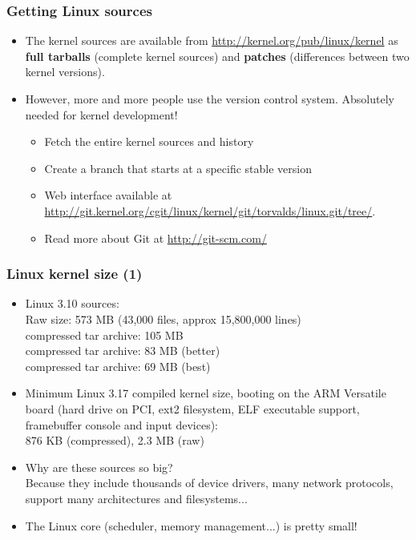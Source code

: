\begin{frame}
  \frametitle{Getting Linux sources}
  \begin{itemize}

  \item The kernel sources are available from
    \url{http://kernel.org/pub/linux/kernel} as {\bf full tarballs}
    (complete kernel sources) and {\bf patches} (differences between
    two kernel versions).
  \item However, more and more people use the  version
    control system. Absolutely needed for kernel development!
    \begin{itemize}
    \item Fetch the entire kernel sources and history\\
    \item Create a branch that starts at a specific stable version\\
    \item Web interface available at
      \url{http://git.kernel.org/cgit/linux/kernel/git/torvalds/linux.git/tree/}.
    \item Read more about Git at \url{http://git-scm.com/}
    \end{itemize}
  \end{itemize}
\end{frame}

\begin{frame}
  \frametitle{Linux kernel size (1)}
  \begin{itemize}
  \item Linux 3.10 sources:\\
    Raw size: 573 MB (43,000 files, approx 15,800,000 lines)\\
     compressed tar archive: 105 MB\\
     compressed tar archive: 83 MB (better)\\
     compressed tar archive: 69 MB (best)
  \item Minimum Linux 3.17 compiled kernel size,
        booting on the ARM Versatile board (hard drive on PCI, ext2
        filesystem, ELF executable support, framebuffer console and input devices):\\
    	876 KB (compressed), 2.3 MB (raw)
  \item Why are these sources so big?\\
    Because they include thousands of device drivers, many network
    protocols, support many architectures and filesystems...
  \item The Linux core (scheduler, memory management...) is pretty
    small!
  \end{itemize}
\end{frame}

